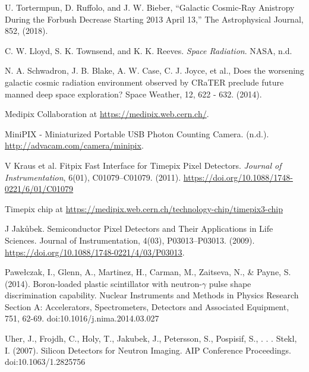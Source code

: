 \begin{thebibliography}{9}
  U. Tortermpun, D. Ruffolo, and J. W. Bieber, “Galactic Cosmic-Ray Anistropy During the Forbush Decrease Starting 2013 April 13,” The Astrophysical Journal, 852, (2018).

  C. W. Lloyd, S. K. Townsend, and K. K. Reeves. \textit{Space Radiation}. NASA, n.d.

  N. A. Schwadron, J. B. Blake, A. W. Case, C. J. Joyce, et al., Does the worsening galactic cosmic radiation environment observed by CRaTER preclude future manned deep space exploration? Space Weather, 12, 622 - 632. (2014).

  Medipix Collaboration at \url{https://medipix.web.cern.ch/}.

  MiniPIX - Miniaturized Portable USB Photon Counting Camera. (n.d.). \url{http://advacam.com/camera/minipix}.

  V Kraus et al. Fitpix Fast Interface for Timepix Pixel Detectors. \textit{Journal of Instrumentation}, 6(01), C01079–C01079. (2011). \url{https://doi.org/10.1088/1748-0221/6/01/C01079}

  Timepix chip at \url{https://medipix.web.cern.ch/technology-chip/timepix3-chip}

  J Jakůbek. Semiconductor Pixel Detectors and Their Applications in Life Sciences. Journal of Instrumentation, 4(03), P03013–P03013. (2009). \url{https://doi.org/10.1088/1748-0221/4/03/P03013}.

  

  Pawełczak, I., Glenn, A., Martinez, H., Carman, M., Zaitseva, N., \& Payne, S. (2014). Boron-loaded plastic scintillator with neutron-$\gamma$ pulse shape discrimination capability. Nuclear Instruments and Methods in Physics Research Section A: Accelerators, Spectrometers, Detectors and Associated Equipment, 751, 62-69. doi:10.1016/j.nima.2014.03.027

  Uher, J., Frojdh, C., Holy, T., Jakubek, J., Petersson, S., Pospisif, S., . . . Stekl, I. (2007). Silicon Detectors for Neutron Imaging. AIP Conference Proceedings. doi:10.1063/1.2825756
  

\end{thebibliography}
